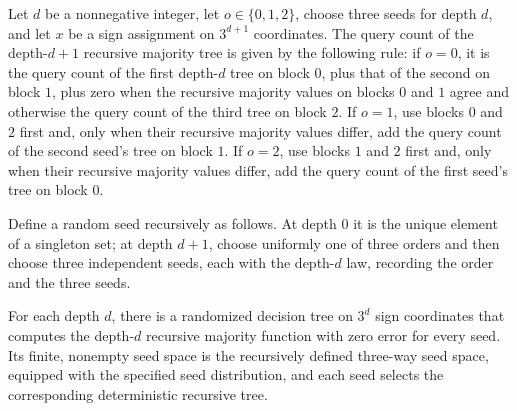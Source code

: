 \begin{theorem}
\label{FABL.queryCount_recursiveMajorityThreeTree_succ}
\leanok
{}
Let $d$ be a nonnegative integer, let $o\in\{0,1,2\}$, choose three seeds for depth
$d$, and let $x$ be a sign assignment on $3^{d+1}$ coordinates. The query count of the
depth-$d+1$ recursive majority tree is given by the following rule: if $o=0$, it is the
query count of the first depth-$d$ tree on block $0$, plus that of the second on block
$1$, plus zero when the recursive majority values on blocks $0$ and $1$ agree and
otherwise the query count of the third tree on block $2$. If $o=1$, use blocks $0$ and
$2$ first and, only when their recursive majority values differ, add the query count of
the second seed's tree on block $1$. If $o=2$, use blocks $1$ and $2$ first and, only
when their recursive majority values differ, add the query count of the first seed's
tree on block $0$.
\end{theorem}

\begin{definition}
\label{FABL.recursiveMajorityThreeSeedLaw}
\leanok
{}
Define a random seed recursively as follows. At depth $0$ it is the unique element of a
singleton set; at depth $d+1$, choose uniformly one of three orders and then choose
three independent seeds, each with the depth-$d$ law, recording the order and the three
seeds.
\end{definition}

\begin{definition}
\label{FABL.recursiveMajorityThreeRandomizedTree}
\leanok
{}
For each depth $d$, there is a randomized decision tree on $3^d$ sign coordinates that
computes the depth-$d$ recursive majority function with zero error for every seed. Its
finite, nonempty seed space is the recursively defined three-way seed space, equipped
with the specified seed distribution, and each seed selects the corresponding
deterministic recursive tree.
\end{definition}

